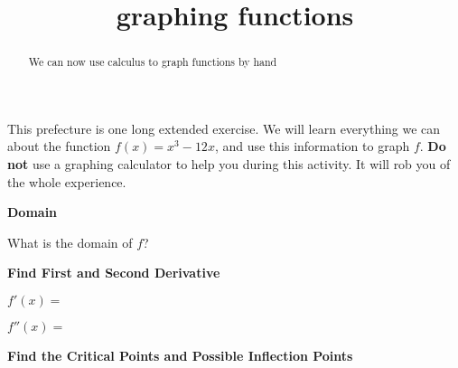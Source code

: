 \documentclass{ximera}
\title{graphing functions}
\begin{document}
\begin{abstract}
  We can now use calculus to graph functions by hand
\end{abstract}

\maketitle




This prefecture is one long extended exercise.  We will learn everything we can about the function $f(x) = x^3-12x$, and use this information to graph $f$.
\textbf{Do not} use a graphing calculator to help you during this activity.  It will rob you of the whole experience.



\textbf{Domain}

\begin{question}
What is the domain of $f$?
 
    \begin{multipleChoice}
    \end{multipleChoice}
    
\end{question}    


 \textbf{Find First and Second Derivative}
 
 \begin{question}
 	$f'(x)=$
 \end{question}
 
 \begin{question}
 	$f''(x)=$
 \end{question}
 
 \textbf{Find the Critical Points and Possible Inflection Points}
 
\end{document}
